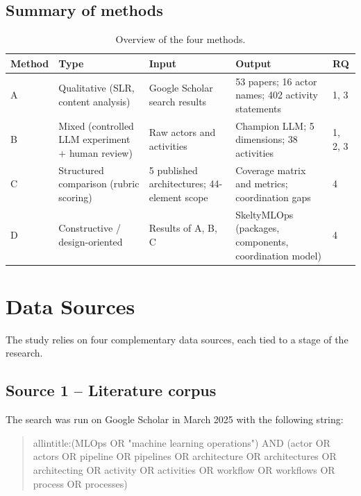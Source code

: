 \documentclass[11pt,a4paper]{article}
\begin{document}
\subsection{Summary of methods}

\begin{table}[H]
\centering
\caption{Overview of the four methods.}
\small
\begin{tabularx}{\textwidth}{@{}L{1.3cm}L{3cm}L{3.2cm}XL{1cm}@{}}
\toprule
Method & Type & Input & Output & RQ \\
\midrule
A & Qualitative (SLR, content analysis) & Google Scholar search results & 53 papers; 16 actor names; 402 activity statements & 1, 3 \\
B & Mixed (controlled LLM experiment + human review) & Raw actors and activities & Champion LLM; 5 dimensions; 38 activities & 1, 2, 3 \\
C & Structured comparison (rubric scoring) & 5 published architectures; 44-element scope & Coverage matrix and metrics; coordination gaps & 4 \\
D & Constructive / design-oriented & Results of A, B, C & SkeltyMLOps (packages, components, coordination model) & 4 \\
\bottomrule
\end{tabularx}
\end{table}

\section{Data Sources}\label{sec:data}

The study relies on four complementary data sources, each tied to a stage of the research.

\subsection{Source 1 -- Literature corpus}

The search was run on Google Scholar in March 2025 with the following string:
\begin{quote}\small\ttfamily
allintitle:(MLOps OR "machine learning operations") AND (actor OR actors OR pipeline OR pipelines OR architecture OR architectures OR architecting OR activity OR activities OR workflow OR workflows OR process OR processes)
\end{quote}
\end{document}

